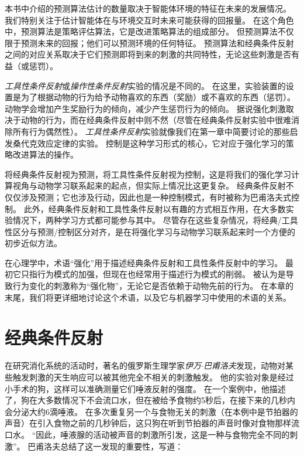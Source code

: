 本书中介绍的预测算法估计的数量取决于智能体环境的特征在未来的发展情况。
我们特别关注于估计智能体在与环境交互时未来可能获得的回报量。
在这个角色中，预测算法是策略评估算法，它是改进策略算法的组成部分。
但预测算法不仅限于预测未来的回报；他们可以预测环境的任何特征\cite{modayil2014prediction}。
预测算法和经典条件反射之间的对应关系取决于它们预测即将到来的刺激的共同特性，无论这些刺激是否有益（或惩罚）。


\textit{工具性条件反射}或\textit{操作性条件反射}实验的情况是不同的。
在这里，实验装置的设置是为了根据动物的行为给予动物喜欢的东西（奖励）或不喜欢的东西（惩罚）。
动物学会增加产生奖励行为的倾向，减少产生惩罚行为的倾向。
据说强化刺激取决于动物的行为，而在经典条件反射中则不然（尽管在经典条件反射实验中很难消除所有行为偶然性）。
\textit{工具性条件反射}实验就像我们在第一章中简要讨论的那些启发桑代克效应定律的实验。
控制是这种学习形式的核心，它对应于强化学习的策略改进算法的操作。


将经典条件反射视为预测，将工具性条件反射视为控制，这是将我们的强化学习计算视角与动物学习联系起来的起点，但实际上情况比这更复杂。
经典条件反射不仅仅涉及预测；它也涉及行动，因此也是一种控制模式，有时被称为巴甫洛夫式控制。
此外，经典条件反射和工具性条件反射以有趣的方式相互作用，在大多数实验情况下，两种学习方式都可能参与其中。
尽管存在这些复杂情况，将经典/工具性区分与预测/控制区分对齐，是在将强化学习与动物学习联系起来时一个方便的初步近似方法。


在心理学中，术语“强化”用于描述经典条件反射和工具性条件反射中的学习。
最初它只指行为模式的加强，但现在也经常用于描述行为模式的削弱。
被认为是导致行为变化的刺激称为“强化物”，无论它是否依赖于动物先前的行为。
在本章的末尾，我们将更详细地讨论这个术语，以及它与机器学习中使用的术语的关系。


\section{经典条件反射} \label{sec:classical_conditioning}

在研究消化系统的活动时，著名的俄罗斯生理学家\textit{伊万$\cdot$巴甫洛夫}发现，动物对某些触发刺激的天生响应可以被其他完全不相关的刺激触发。
他的实验对象是经过小手术的狗，这样可以准确测量它们唾液反射的强度。
在一个案例中，他描述了，狗在大多数情况下不会流口水，但在被给予食物约5秒后，在接下来的几秒内会分泌大约6滴唾液。
在多次重复另一个与食物无关的刺激（在本例中是节拍器的声音）在引入食物之前的几秒钟后，这只狗在听到节拍器的声音时像对食物那样流口水。
“因此，唾液腺的活动被声音的刺激所引发，这是一种与食物完全不同的刺激”。
巴甫洛夫总结了这一发现的重要性，写道：


